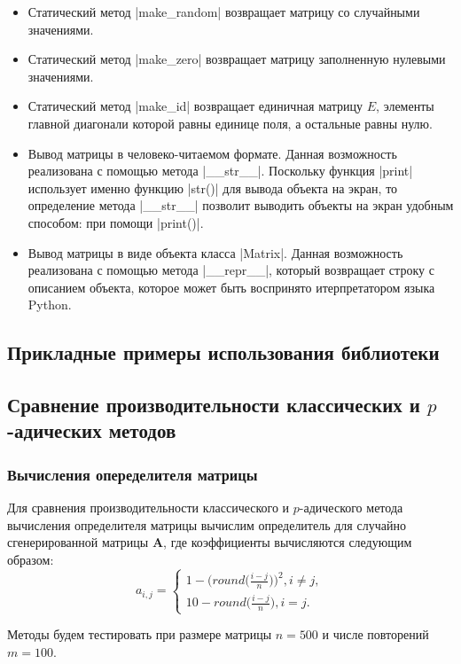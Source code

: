 \documentclass[master, och, diploma, times]{sty/SCWorks}
\theoremstyle{plain}
\theoremstyle{definition}
\begin{document}
\begin{itemize}
\item Статический метод |make_random| возвращает матрицу со случайными значениями.
\item Статический метод |make_zero| возвращает матрицу заполненную нулевыми значениями.
\item Статический метод |make_id| возвращает единичная матрицу $E$, элементы главной диагонали которой равны единице поля, а остальные равны нулю.
\item Вывод матрицы в человеко-читаемом формате. Данная возможность реализована с помощью метода |__str__|. Поскольку функция |print| использует именно функцию |str()| для вывода объекта на экран, то определение метода |__str__| позволит выводить объекты на экран удобным способом: при помощи |print()|.
\item Вывод матрицы в виде объекта класса |Matrix|. Данная возможность реализована с помощью метода |__repr__|, который возвращает строку с описанием объекта, которое может быть воспринято итерпретатором языка Python.

	
\end{itemize}



\subsection{Прикладные примеры использования библиотеки}

\subsection{Сравнение производительности классических и $p$-адических методов}

\subsubsection{Вычисления опеределителя матрицы}

Для сравнения производительности классического и $p$-адического метода вычисления определителя матрицы вычислим определитель для случайно сгенерированной матрицы $\boldsymbol{A}$, где коэффициенты вычисляются следующим образом:
$$
a_{i,j}= 
\begin{cases} 
1-\bigg(round\bigg(\frac{i-j}{n}\bigg)\bigg)^2, i \neq j, \\ 
10-round\bigg(\frac{i-j}{n}\bigg), i = j.
\end{cases}
$$

Методы будем тестировать при размере матрицы $n=500$ и числе повторений $m=100$.
\end{document}
